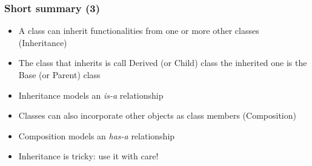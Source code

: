 \documentclass[9pt]{beamer}
\begin{document}
\begin{frame}
  \frametitle{Short summary (3)}
    
  \begin{itemize}
    \item A class can inherit functionalities from one or more other classes (Inheritance)
    \medskip
    \item The class that inherits is call Derived (or Child) class the inherited one is the Base (or Parent) class
    \medskip
    \item Inheritance models an \emph{is-a} relationship
    \medskip
    \item Classes can also incorporate other objects as class members (Composition)
    \medskip
    \item Composition models an \emph{has-a} relationship
    \medskip
    \item Inheritance is tricky: use it with care!
   \end{itemize}
  
\end{frame}
\end{document}
